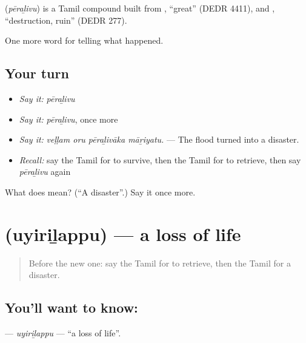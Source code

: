 \begin{cousinweb}
\textbf{} (\emph{pēraḻivu}) is a Tamil compound built from , \textquotedblleft{}great\textquotedblright{} (DEDR 4411), and , \textquotedblleft{}destruction, ruin\textquotedblright{} (DEDR 277).
\end{cousinweb}

\begin{grammarlens}[title={What you've built}]
One more word for telling what happened.
\end{grammarlens}

\subsection*{Your turn}
\begin{itemize}
\raggedright
  \item \emph{Say it:} \emph{pēraḻivu}
  \item \emph{Say it:} \emph{pēraḻivu}, once more
  \item \emph{Say it:} \emph{veḷḷam oru pēraḻivāka māṟiyatu.} — The flood turned into a disaster.
  \item \emph{Recall:} say the Tamil for to survive, then the Tamil for to retrieve, then say \emph{pēraḻivu} again
\end{itemize}

\begin{tcolorbox}[breakable,colback=teal!4,colframe=teal!35!black,title={Before you move on}]
What does  mean? (\textquotedblleft{}A disaster\textquotedblright{}.) Say it once more.
\end{tcolorbox}
\section[\texorpdfstring{\ta{உயிரிழப்பு} (uyiriḻappu)}{உயிரிழப்பு (uyiriḻappu)}]{ (uyiriḻappu) — a loss of life}

\label{lesson:TA-C302-uyirilappu}



\begin{quote}
Before the new one: say the Tamil for to retrieve, then the Tamil for a disaster.
\end{quote}

\subsection*{You'll want to know: }
\textbf{} — \emph{uyiriḻappu} — \textquotedblleft{}a loss of life\textquotedblright{}.

